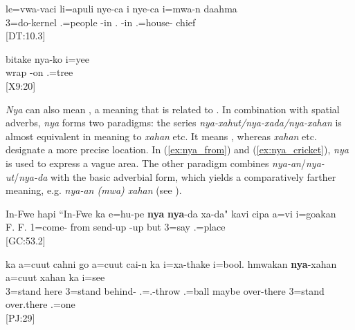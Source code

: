 \ea\label{ex:nya1}\gll le=vwa-vaci li=apuli nye-ca i nye-ca i=mwa-n daahma\\
 3=do-kernel .=people -in . -in .=house- chief\\
\glt {} {[DT:10.3]}
\z

\ea\label{ex:nyako}\gll bitake nya-ko i=yee\\
 wrap -on .=tree\\
\glt {} {[X9:20]}
\z

\textit{Nya} can also mean , a meaning that is related to . In combination with spatial adverbs, \textit{nya} forms two paradigms: the series \textit{nya-xahut/nya-xada/nya-xahan} is almost equivalent in meaning to \textit{xahan}  etc. It means , whereas \textit{xahan} etc. designate a more precise location.  In (\ref{ex:nya_from}) and (\ref{ex:nya_cricket}), \textit{nya} is used to express a vague area. The other paradigm combines \textit{nya-an}/\textit{nya-ut}/\textit{nya-da}  with the basic adverbial form, which yields a comparatively farther meaning, e.g. \textit{nya-an (mwa) xahan}  (see ).



\ea\label{ex:nya_from}\gll In-Fwe hapi ``In-Fwe ka e=hu-pe \textbf{nya} \textbf{nya}-da xa-da" kavi cipa a=vi i=goakan\\
 F.  F.  1=come- from send-up -up but  3=say .=place\\
\glt {} {[GC:53.2]}
\z 

\ea\label{ex:nya_cricket}
\gll ka a=cuut cahni go a=cuut cai-n ka i=xa-thake i=bool. hmwakan \textbf{nya}-xahan a=cuut xahan ka i=see\\
  3=stand here  3=stand behind-  .=.-throw .=ball maybe over-there 3=stand over.there  .=one\\
\glt {} {[PJ:29]}
\z

